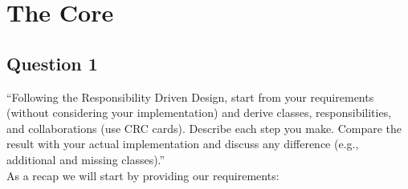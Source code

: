\chapter{The Core}
\section{Question 1}

``Following the Responsibility Driven Design, start from your requirements (without considering your implementation) and derive classes, responsibilities, and collaborations (use CRC cards). Describe each step you make. Compare the result with your actual implementation and discuss any difference (e.g., additional and missing classes).'' \\

\noindent As a recap we will start by providing our requirements: 
